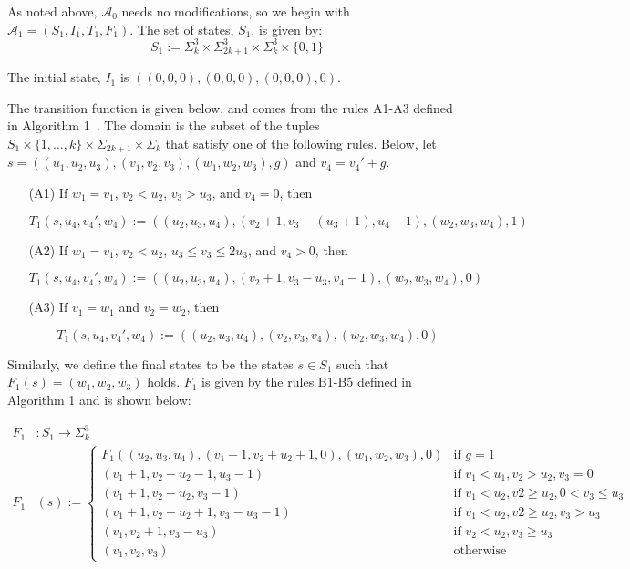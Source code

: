 As noted above, $\mathcal{A}_0$ needs no modifications, so we begin with $\mathcal{A}_1 = (S_1, I_1, T_1, F_1)$.
The set of states, $S_1$, is given by:
\begin{equation*}\label{def:alg1-states}
    S_1 := \Sigma_k^3 \times \Sigma_{2k+1}^3 \times \Sigma_k^3 \times \{0,1\}
\end{equation*}

The initial state, $I_1$ is $((0,0,0),(0,0,0),(0,0,0),0)$.

The transition function is given below, and comes from the rules A1-A3 defined in Algorithm 1~\cite{ht-ostrowski}.
The domain is the subset of the tuples $S_1 \times \{1,\ldots,k\} \times \Sigma_{2k+1} \times \Sigma_k$ that satisfy one of the following rules.
Below, let $s = ((u_1,u_2,u_3),(v_1,v_2,v_3),(w_1,w_2,w_3),g)$ and $v_4 = v_4' + g$.

\begin{itemize}
    \item[(A1)] If $w_1 = v_1$, $v_2 < u_2$, $v_3 > u_3$, and $v_4 = 0$, then 
    
    $$T_1(s,u_4,v_4',w_4) := ((u_2,u_3,u_4),(v_2 + 1, v_3-(u_3+1),u_4-1),(w_2,w_3,w_4),1)$$
    
    \item[(A2)] If $w_1 = v_1$, $v_2 < u_2$, $u_3 \leq v_3 \leq 2u_3$, and $v_4 > 0$, then
    
    $$T_1(s,u_4,v_4',w_4) := ((u_2,u_3,u_4),(v_2+1,v_3-u_3,v_4-1),(w_2,w_3,w_4),0)$$
    
    \item[(A3)] If $v_1 = w_1$ and $v_2 = w_2$, then
    
    $$T_1(s,u_4,v_4',w_4) := ((u_2,u_3,u_4),(v_2,v_3,v_4),(w_2,w_3,w_4),0)$$
\end{itemize}

Similarly, we define the final states to be the states $s \in S_1$ such that $F_1(s) = (w_1,w_2,w_3)$ holds.
$F_1$ is given by the rules B1-B5 defined in Algorithm 1 and is shown below:

\begin{equation*}\label{def:alg1-final-func}
\begin{split}
    F_1&: S_1 \rightarrow \Sigma_k^3\\
    F_1&(s) := 
    \begin{cases}
        F_1((u_2,u_3,u_4),(v_1 - 1, v_2 + u_2 + 1, 0),(w_1,w_2,w_3),0) & \text{if } g = 1\\
        (v_1 + 1,v_2-u_2-1,u_3-1) & \text{if } v_1 < u_1,v_2 > u_2, v_3 = 0\\
        (v_1 + 1, v_2 - u_2, v_3 - 1) & \text{if } v_1 < u_2, v2 \geq u_2, 0 < v_3 \leq u_3\\
        (v_1 + 1, v_2 - u_2 + 1, v_3 - u_3 - 1) & \text{if } v_1 < u_2, v2 \geq u_2, v_3 > u_3\\
        (v_1, v_2 + 1, v_3 - u_3) & \text{if } v_2 < u_2, v_3 \geq u_3\\
        (v_1,v_2,v_3) & \text{otherwise}
    \end{cases}
\end{split}
\end{equation*}

